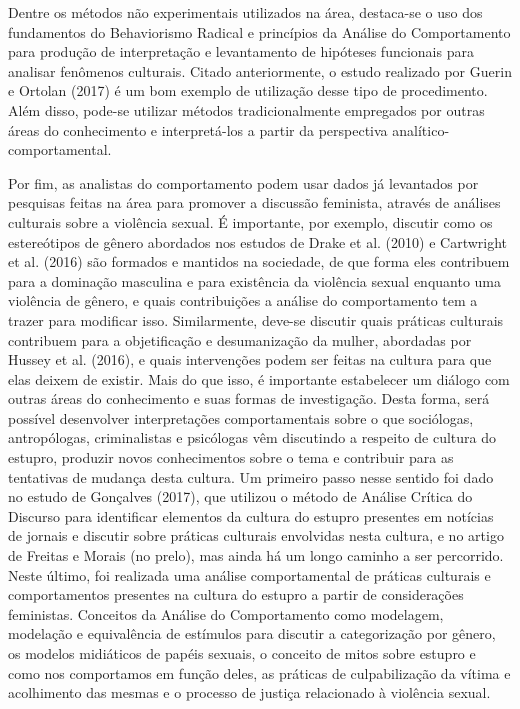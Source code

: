 Dentre os métodos não experimentais utilizados na área, destaca-se o uso dos fundamentos do Behaviorismo Radical e princípios da Análise do Comportamento para produção de interpretação e levantamento de hipóteses funcionais para analisar fenômenos culturais. Citado anteriormente, o estudo realizado por Guerin e Ortolan (2017) é um bom exemplo de utilização desse tipo de procedimento. Além disso, pode-se utilizar métodos tradicionalmente empregados por outras áreas do conhecimento e interpretá-los a partir da perspectiva analítico-comportamental.

Por fim, as analistas do comportamento podem usar dados já levantados por pesquisas feitas na área para promover a discussão feminista, através de análises culturais sobre a violência sexual. É importante, por exemplo, discutir como os estereótipos de gênero abordados nos estudos de Drake et al. (2010) e Cartwright et al. (2016) são formados e mantidos na sociedade, de que forma eles contribuem para a dominação masculina e para existência da violência sexual enquanto uma violência de gênero, e quais contribuições a análise do comportamento tem a trazer para modificar isso. Similarmente, deve-se discutir quais práticas culturais contribuem para a objetificação e desumanização da mulher, abordadas por Hussey et al. (2016), e quais intervenções podem ser feitas na cultura para que elas deixem de existir. Mais do que isso, é importante estabelecer um diálogo com outras áreas do conhecimento e suas formas de investigação. Desta forma, será possível desenvolver interpretações comportamentais sobre o que sociólogas, antropólogas, criminalistas e psicólogas vêm discutindo a respeito de cultura do estupro, produzir novos conhecimentos sobre o tema e contribuir para as tentativas de mudança desta cultura. Um primeiro passo nesse sentido foi dado no estudo de Gonçalves (2017), que utilizou o método de Análise Crítica do Discurso para identificar elementos da cultura do estupro presentes em notícias de jornais e discutir sobre práticas culturais envolvidas nesta cultura, e no artigo de Freitas e Morais (no prelo), mas ainda há um longo caminho a ser percorrido. Neste último, foi realizada uma análise comportamental de práticas culturais e comportamentos presentes na cultura do estupro a partir de considerações feministas. Conceitos da Análise do Comportamento como modelagem, modelação e equivalência de estímulos para discutir a categorização por gênero, os modelos midiáticos de papéis sexuais, o conceito de mitos sobre estupro e como nos comportamos em função deles, as práticas de culpabilização da vítima e acolhimento das mesmas e o processo de justiça relacionado à violência sexual.


